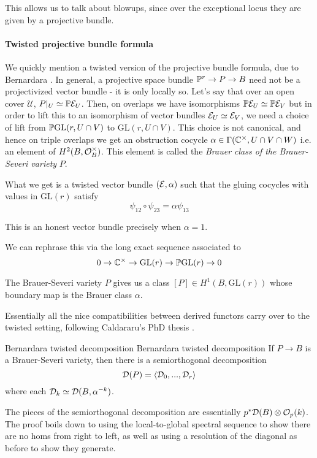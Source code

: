 This allows us to talk about blowups, since over the exceptional locus they are given by a projective bundle.

\paragraph*{Twisted projective bundle formula}
We quickly mention a twisted version of the projective bundle formula, due to Bernardara \cite{bernardara_semiorthogonal_2005}. In general, a projective space bundle $\P^r \rightarrow P\rightarrow B$ need not be a projectivized vector bundle - it is only locally so. Let's say that over an open cover $\mathcal{U}$, $P|_U\simeq \P \calE_U$. Then, on overlaps we have isomorphisms $\P\calE_U \simeq \P \calE_V$ but in order to lift this to an isomorphism of vector bundles $\calE_U \simeq \calE_V$, we need a choice of lift from $\P\mathrm{GL}(r,U\cap V)$ to $\mathrm{GL}(r,U\cap V)$. This choice is not canonical, and hence on triple overlaps we get an obstruction cocycle $\alpha \in \Gamma(\C^\times, U\cap V \cap W)$ i.e. an element of $H^2(B,\O_B^\times)$. This element is called the \emph{Brauer class of the Brauer-Severi variety }$P$. 

What we get is a twisted vector bundle $(\calE, \alpha)$ such that the gluing cocycles with values in $\mathrm{GL}(r)$ satisfy $$\psi_{12} \circ \psi_{23}=\alpha \psi_{13}$$

This is an honest vector bundle precisely when $\alpha=1$. 

We can rephrase this via the long exact sequence associated to $$0\rightarrow \C^\times \rightarrow \mathrm{GL}(r)\rightarrow \P \mathrm{GL}(r)\rightarrow 0$$

The Brauer-Severi variety $P$ gives us a class $[P]\in H^1(B, \mathrm{GL}(r))$ whose boundary map is the Brauer class $\alpha$. 

Essentially all the nice compatibilities between derived functors carry over to the twisted setting, following Caldararu's PhD thesis \cite{CaldararuThesis}. 

\begin{proposition}{Bernardara twisted decomposition \cite{bernardara_semiorthogonal_2005}}{Bernardara twisted decomposition}
    If $P\rightarrow B$ is a Brauer-Severi variety, then there is a semiorthogonal decomposition $$\calD(P)=\langle \calD_0,..., \calD_r\rangle$$
    where each $\calD_k\simeq \calD(B,\alpha^{-k})$.  
\end{proposition}

The pieces of the semiorthogonal decomposition are essentially $p^*\calD(B)\otimes \O_p(k)$. The proof boils down to using the local-to-global spectral sequence to show there are no homs from right to left, as well as using a resolution of the diagonal as before to show they generate.

